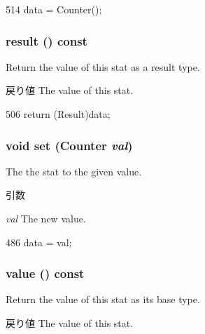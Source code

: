 \begin{DoxyCode}
514 { data = Counter(); }
\end{DoxyCode}
\hypertarget{classStats_1_1StatStor_ae050da86c3d8e8a677a0bdeb7971e1e3}{
\subsubsection[{result}]{ result () const}}
\label{classStats_1_1StatStor_ae050da86c3d8e8a677a0bdeb7971e1e3}
Return the value of this stat as a result type. \begin{DoxyReturn}{戻り値}
The value of this stat. 
\end{DoxyReturn}



\begin{DoxyCode}
506 { return (Result)data; }
\end{DoxyCode}
\hypertarget{classStats_1_1StatStor_a7687ba04921eb09ab374fb40c4e1eb9d}{
\subsubsection[{set}]{\setlength{\rightskip}{0pt plus 5cm}void set ({\bf Counter} {\em val})}}
\label{classStats_1_1StatStor_a7687ba04921eb09ab374fb40c4e1eb9d}
The the stat to the given value. 
\begin{DoxyParams}{引数}
\item[{\em val}]The new value. \end{DoxyParams}



\begin{DoxyCode}
486 { data = val; }
\end{DoxyCode}
\hypertarget{classStats_1_1StatStor_aa9e486cb7eb0ad44f5f89923594b68a4}{
\subsubsection[{value}]{ value () const}}
\label{classStats_1_1StatStor_aa9e486cb7eb0ad44f5f89923594b68a4}
Return the value of this stat as its base type. \begin{DoxyReturn}{戻り値}
The value of this stat. 
\end{DoxyReturn}



